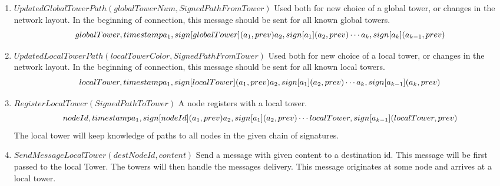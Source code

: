 \documentclass{amsart}
\theoremstyle{definition}
\theoremstyle{remark}
\numberwithin{equation}{section}
\begin{document}
\begin{enumerate}
  \item $UpdatedGlobalTowerPath(globalTowerNum, SignedPathFromTower)$
      Used both for new choice of a global tower, or changes in the network layout.
      In the beginning of connection, this message should be sent for all known
      global towers. 
      \[
        globalTower,  timestamp                     \\
        a_1,          sign[globalTower](a_1, prev)  \\
        a_2,          sign[a_1](a_2, prev)          \\
        \cdots                                      \\
        a_k,          sign[a_k](a_{k-1}, prev)
      \]

  \item $UpdatedLocalTowerPath(localTowerColor, SignedPathFromTower)$
      Used both for new choice of a local tower, or changes in the network
      layout. In the beginning of connection, this message should be sent for
      all known local towers. 
      \[
        localTower,   timestamp                     \\
        a_1,          sign[localTower](a_1, prev)   \\
        a_2,          sign[a_1](a_2, prev)          \\
        \cdots                                      \\
        a_k,          sign[a_{k-1}](a_k, prev)
      \]

  \item $RegisterLocalTower(SignedPathToTower)$
      A node registers with a local tower.
      \[
        nodeId,       timestamp                   \\
        a_1,          sign[nodeId](a_1, prev)    \\
        a_2,          sign[a_1](a_2, prev)        \\
        \cdots                                    \\
        localTower,   sign[a_{k-1}](localTower, prev)
      \]
      The local tower will keep knowledge of paths to all nodes in the given
      chain of signatures.


  \item $SendMessageLocalTower(destNodeId, content)$
    Send a message with given content to a destination id.
    This message will be first passed to the local Tower. The towers will then
    handle the messages delivery.
    This message originates at some node and arrives at a local tower.


\end{enumerate}
\end{document}
